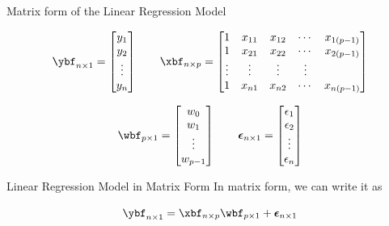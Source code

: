 \documentclass[aspectratio=169,xcolor=dvipsnames,svgnames,x11names,fleqn]{beamer}
\begin{document}
\begin{frame}[allowframebreaks]{Matrix form of the Linear Regression Model}

    \begin{equation}
        \ybf_{n\times 1} = \begin{bmatrix}
            y_1 \\ y_2 \\ \vdots \\  y_n
        \end{bmatrix}
    \quad \quad
          \xbf_{n\times p} = \begin{bmatrix}
            1 & x_{11} & x_{12} & \cdots & x_{1(p-1)}\\
            1 & x_{21} & x_{22} & \cdots & x_{2(p-1)}\\
            \vdots & \vdots & \vdots & \vdots\\
            1 & x_{n1} & x_{n2} & \cdots & x_{n(p-1)}
        \end{bmatrix}    
    \end{equation}
    
    \begin{equation}
        \wbf_{p\times 1} = \begin{bmatrix}
            w_0 \\ w_1 \\ \vdots \\  w_{p-1}
        \end{bmatrix}
    \quad \quad
        \boldsymbol{\epsilon}_{n\times 1} = \begin{bmatrix}
             \epsilon_1 \\  \epsilon_2 \\ \vdots \\  \epsilon_n
        \end{bmatrix}   
    \end{equation}
    \end{frame}
    
    \begin{frame}[allowframebreaks]{Linear Regression Model in Matrix Form}
    \vspace{10pt}
    In matrix form, we can write it as
    
    \begin{facts}{}
        {\Huge
    
        \begin{equation}
            \ybf_{n\times 1} = \xbf_{n\times p}\wbf_{p\times 1} + \boldsymbol{\epsilon}_{n\times 1}
        \end{equation}
        }
    \end{facts}
    \end{frame}
    
\end{document}
